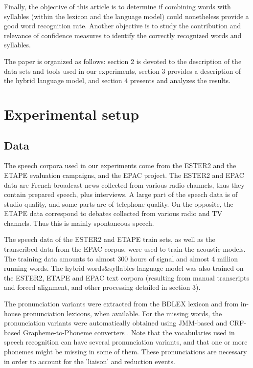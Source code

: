 \documentclass[a4paper]{article}
\begin{document}
Finally, the objective of this article is to determine if combining words with syllables (within the lexicon and the language model) could nonetheless provide a good word recognition rate. Another objective is to study the contribution and relevance of confidence measures to identify the correctly recognized words and syllables.

The paper is organized as follows: section 2 is devoted to the description of the data sets and tools used in our experiments, section 3 provides a description of the hybrid language model, and section 4 presents and analyzes the results.


\section{Experimental setup}


\subsection{Data}

The speech corpora used in our experiments come from the ESTER2 \cite{Galliano2009} and the ETAPE \cite{gravier2012} evaluation campaigns, and the EPAC \cite{ESTEVE2010} project. The ESTER2 and EPAC data are French broadcast news collected from various radio channels, thus they contain prepared speech, plus interviews. A large part of the speech data is of studio quality, and some parts are of telephone quality. On the opposite, the ETAPE data correspond to debates collected from various radio and TV channels. Thus this is mainly spontaneous speech.

The speech data of the ESTER2 and ETAPE train sets, as well as the transcribed data from the EPAC corpus, were used to train the acoustic models. The training data amounts to almost 300 hours of signal and almost 4 million running words. The hybrid words\&syllables language model was also trained on the ESTER2, ETAPE and EPAC text corpora (resulting from manual transcripts and forced alignment, and other processing detailed in section 3).

The pronunciation variants were extracted from the BDLEX lexicon \cite{Calmes1998} and from in-house pronunciation lexicons, when available. For the missing words, the pronunciation variants were automatically obtained using JMM-based and CRF-based Grapheme-to-Phoneme converters \cite{illina2011}. Note that the vocabularies used in speech recognition can have several pronunciation variants, and that one or more phonemes might be missing in some of them. These pronunciations are necessary in order to account for the 'liaison' and reduction events.
\end{document}
